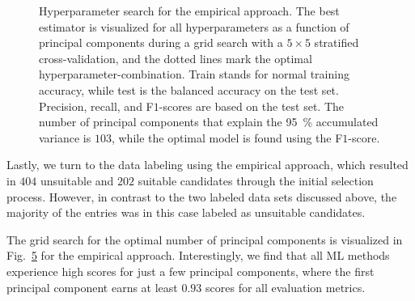 \documentclass[superscriptaddress,unsortedaddress,
 amsmath,amssymb,
 aps,
]{revtex4-2}
\begin{document}
\begin{figure}[ht!]
  \begin{subfigure}[b]{1.0\textwidth}
    \centering
    
  \end{subfigure}
  \par\bigskip
  \begin{subfigure}[b]{0.5\textwidth}
    
    \caption{}
    \label{fig:q3-LOG}
  \end{subfigure}%
  \hfill
  \begin{subfigure}[b]{0.5\textwidth}
    
    \caption{}
    \label{fig:q3-DT}
  \end{subfigure}
  \begin{subfigure}[b]{0.5\textwidth}
    
    \caption{}
    \label{fig:q3-RF}
  \end{subfigure}%
  \hfill
  \begin{subfigure}[b]{0.5\textwidth}
    
    \caption{}
    \label{fig:q3-GB}
  \end{subfigure}

  \caption{{Hyperparameter search for the empirical approach. The best estimator is visualized for all hyperparameters as a function of principal components during a grid search with a $5\times5$ stratified cross-validation, and the dotted lines mark the optimal hyperparameter-combination. Train stands for normal training accuracy, while test is the balanced accuracy on the test set. Precision, recall, and F$1$-scores are based on the test set. The number of principal components that explain the \SI{95}{\percent} accumulated variance is $103$, while the optimal model is found using the F$1$-score.}}
  \label{fig:03-pca}
\end{figure}

Lastly, we turn to the data labeling using the empirical approach, which resulted in $404$ unsuitable and $202$ suitable candidates through the initial selection process. However, in contrast to the two labeled data sets discussed above, the majority of the entries was in this case labeled as unsuitable candidates. 

The grid search for the optimal number of principal components is visualized in Fig.~\ref{fig:03-pca} for the empirical approach. Interestingly, we find that all ML methods  experience high scores for just a few principal components, where the first principal component earns at least $0.93$ scores for all evaluation metrics. 
\end{document}
